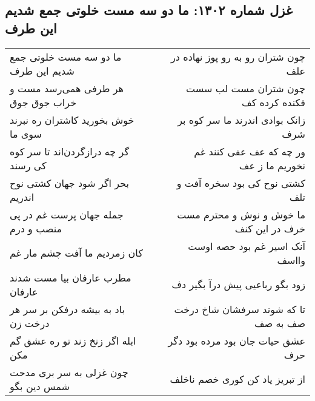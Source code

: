 \begin{center}
\section*{غزل شماره ۱۳۰۲: ما دو سه مست خلوتی جمع شدیم این طرف}
\label{sec:1302}
\begin{longtable}{l p{0.5cm} r}
ما دو سه مست خلوتی جمع شدیم این طرف
&&
چون شتران رو به رو پوز نهاده در علف
\\
هر طرفی همی‌رسد مست و خراب جوق جوق
&&
چون شتران مست لب سست فکنده کرده کف
\\
خوش بخورید کاشتران ره نبرند سوی ما
&&
زانک بوادی اندرند ما سر کوه بر شرف
\\
گر چه درازگردن‌اند تا سر کوه کی رسند
&&
ور چه که عف عفی کنند غم نخوریم ما ز عف
\\
بحر اگر شود جهان کشتی نوح اندریم
&&
کشتی نوح کی بود سخره آفت و تلف
\\
جمله جهان پرست غم در پی منصب و درم
&&
ما خوش و نوش و محترم مست خرف در این کنف
\\
کان زمردیم ما آفت چشم مار غم
&&
آنک اسیر غم بود حصه اوست وااسف
\\
مطرب عارفان بیا مست شدند عارفان
&&
زود بگو رباعیی پیش درآ بگیر دف
\\
باد به بیشه درفکن بر سر هر درخت زن
&&
تا که شوند سرفشان شاخ درخت صف به صف
\\
ابله اگر زنخ زند تو ره عشق گم مکن
&&
عشق حیات جان بود مرده بود دگر حرف
\\
چون غزلی به سر بری مدحت شمس دین بگو
&&
از تبریز یاد کن کوری خصم ناخلف
\\
\end{longtable}
\end{center}
